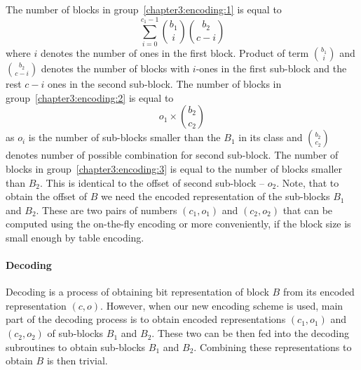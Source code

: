 The number of blocks in group~\ref{chapter3:encoding:1} is equal to
$$\sum_{i=0}^{c_1-1} {b_1\choose i} {b_2\choose c-i}$$ where $i$ denotes the number
of ones in the first block. Product of term ${b_1\choose i}$ and ${b_2\choose c-i}$
denotes the number of blocks with $i$-ones in the first sub-block and the rest
$c-i$ ones in the second sub-block. The number of blocks in group~\ref{chapter3:encoding:2}
is equal to $$o_1\times {b_2\choose c_2}$$ as $o_i$ is the number of sub-blocks smaller
than the $B_1$ in its class and ${b_2\choose c_2}$ denotes number of possible combination
for second sub-block. The number of blocks in group~\ref{chapter3:encoding:3} is equal to
the number of blocks smaller than $B_2$. This is identical to the offset of second
sub-block -- $o_2$. Note, that to obtain the offset of $B$ we need the encoded representation
of the sub-blocks $B_1$ and $B_2$. These are two pairs of numbers $(c_1, o_1)$ and $(c_2, o_2)$
that can be computed using the on-the-fly encoding or more conveniently, if the block size is
small enough by table encoding.

\paragraph{Decoding}

Decoding is a process of obtaining bit representation of block $B$ from its encoded
representation $(c, o)$. However, when our new encoding scheme is used, main part
of the decoding process is to obtain encoded representations $(c_1, o_1)$ and
$(c_2, o_2)$ of sub-blocks $B_1$ and $B_2$. These two can be then fed into
the decoding subroutines to obtain sub-blocks $B_1$ and $B_2$. Combining these
representations to obtain $B$ is then trivial.

